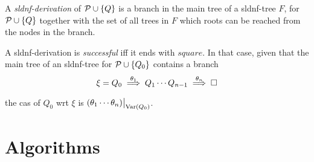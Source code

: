 \begin{dfn}
    A \emph{\gls{sldnf}-derivation} of \(\mathcal{P} \cup \lbrace Q \rbrace\) is a branch in the main tree of a \gls{sldnf}-tree \(F\), for \(\mathcal{P} \cup \lbrace Q \rbrace\) together with the set of all trees in \(F\) which roots can be reached from the nodes in the branch.

    A \gls{sldnf}-derivation is \emph{successful} iff it ends with \(square\).
    In that case, given that the main tree of an \gls{sldnf}-tree for \(\mathcal{P} \cup \lbrace Q_0 \rbrace\) contains a branch
    \begin{equation*}
        \xi = Q_0 \underset{}{\overset{\theta_1}{\implies}} Q_1 \dotsb Q_{n-1}
        \underset{}{\overset{\theta_n}{\implies}} \square
    \end{equation*}
    the \gls{cas} of \(Q_0\) wrt \(\xi\) is \(\restr{(\theta_1\dotsb\theta_n)}{\Var(Q_0)}\).
\end{dfn}

\section{Algorithms}

